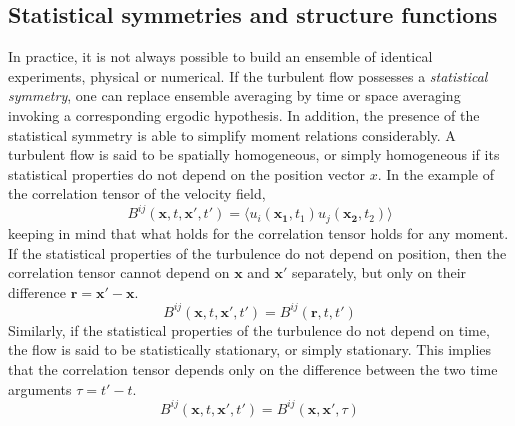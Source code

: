 \subsection{Statistical symmetries and structure functions}
In practice, it is not always possible to build an ensemble of identical experiments, physical or  numerical. If the turbulent flow possesses a \emph{statistical symmetry}, one can replace ensemble averaging by time or space averaging invoking a corresponding ergodic hypothesis. In addition, the presence of the statistical symmetry is able to simplify moment relations considerably.
A turbulent flow is said to be spatially homogeneous, or simply homogeneous if its statistical properties do not depend on the position vector $x$. In the example of the correlation tensor of the velocity field,
\begin{equation}
B^{ij}(\mathbf{x},t,\mathbf{x}',t')=\langle u_i(\mathbf{x_1},t_1)u_j(\mathbf{x_2},t_2)\rangle    
\end{equation}
keeping in mind that what holds for the correlation tensor holds for any moment. If the statistical properties of the turbulence do not depend on position, then the correlation tensor cannot depend on $\mathbf{x}$ and $\mathbf{x'}$ separately, but only on their difference $\mathbf{r=x'-x}$. 
\begin{equation}
   B^{ij}(\mathbf{x},t,\mathbf{x}',t')=B^{ij}(\mathbf{r},t,t')
\end{equation}
Similarly, if the statistical properties of the turbulence do not depend on time, the flow is said to be statistically stationary, or simply stationary. This implies that the correlation tensor depends only on the difference between the two time arguments $\tau=t'-t$.
\begin{equation}
    B^{ij}(\mathbf{x},t,\mathbf{x}',t')=B^{ij}(\mathbf{x},\mathbf{x'},\tau)
\end{equation}
